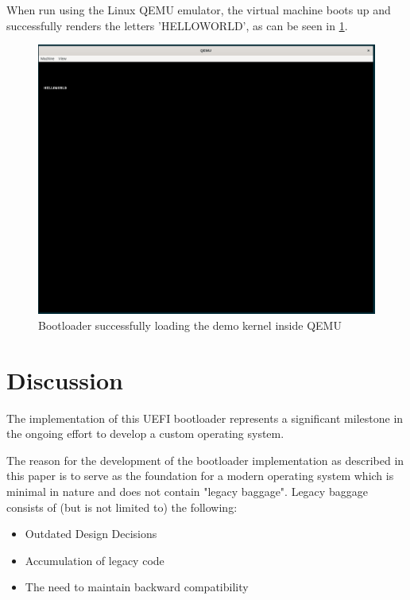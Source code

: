 \documentclass[conference]{IEEEtran}
\begin{document}
When run using the Linux QEMU emulator, the virtual machine boots up and successfully renders the letters 'HELLOWORLD', as can be seen in \ref{screenshot}.

\begin{figure}[!t]
    \centering
    \includegraphics[width=0.9\columnwidth]{screenshot.png}
    \caption{Bootloader successfully loading the demo kernel inside QEMU}
    \label{screenshot}
\end{figure}

\section{Discussion}
The implementation of this UEFI bootloader represents a significant milestone in the ongoing effort to develop a custom operating system. \cite{elflatest}


The reason for the development of the bootloader implementation as described in this paper is to serve as the foundation for a modern operating system which is minimal in nature and does not contain "legacy baggage". Legacy baggage consists of (but is not limited to) the following:

\begin{itemize}
    \item Outdated Design Decisions
    \item Accumulation of legacy code
    \item The need to maintain backward compatibility
\end{itemize}
\end{document}
